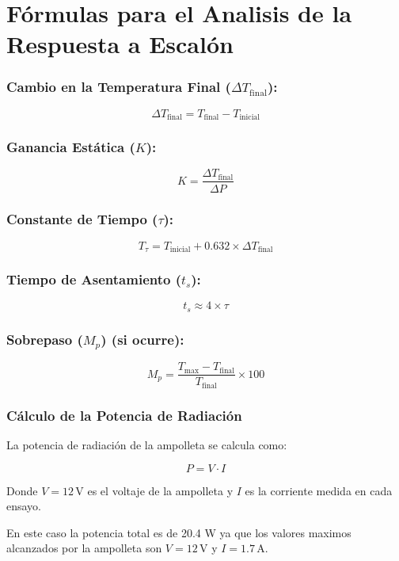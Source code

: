 \documentclass[spanish, a4paper, 11pt]{article}
\begin{document}
\newpage

\section*{Fórmulas para el Analisis de la Respuesta a Escalón}

\subsubsection*{Cambio en la Temperatura Final (\( \Delta T_{\text{final}} \)):}
\[
\Delta T_{\text{final}} = T_{\text{final}} - T_{\text{inicial}}
\]

\subsubsection*{Ganancia Estática (\( K \)):}
\[
K = \frac{\Delta T_{\text{final}}}{\Delta P}
\]

\subsubsection*{Constante de Tiempo (\( \tau \)):}
\[
T_{\tau} = T_{\text{inicial}} + 0.632 \times \Delta T_{\text{final}}
\]

\subsubsection*{Tiempo de Asentamiento (\( t_s \)):}
\[
t_s \approx 4 \times \tau
\]

\subsubsection*{Sobrepaso (\( M_p \)) (si ocurre):}
\[
M_p = \frac{T_{\text{max}} - T_{\text{final}}}{T_{\text{final}}} \times 100
\]

\subsubsection{Cálculo de la Potencia de Radiación}

La potencia de radiación de la ampolleta se calcula como:

\[
P = V \cdot I
\]

Donde \( V = 12 \, \text{V} \) es el voltaje de la ampolleta y \( I \) es la corriente medida en cada ensayo.

En este caso la potencia total es de 20.4 W ya que los valores maximos alcanzados por la ampolleta son \( V = 12 \, \text{V} \) y \( I = 1.7 \, \text{A} \).
\end{document}
